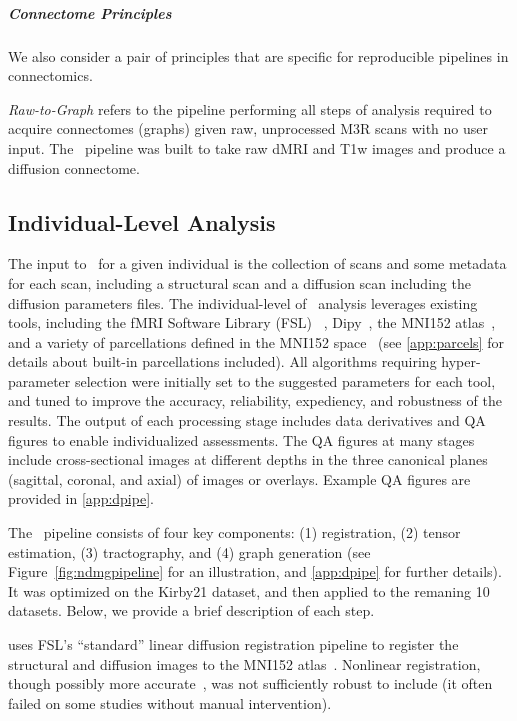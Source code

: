 \documentclass[11pt]{article}
\begin{document}
\begin{multicols}{2}
\subparagraph*{Connectome Principles} We also consider a pair of principles that are specific for reproducible pipelines in connectomics.

\emph{Raw-to-Graph} refers to the pipeline performing all steps of analysis required to acquire connectomes (graphs) given raw, unprocessed M3R scans with no user input.
The \ndmg~pipeline was built to take raw dMRI and T1w images and produce a diffusion connectome.


\subsection{Individual-Level Analysis}



%

The input to \ndmg~for a given individual is the collection of scans and some metadata for each scan, including a structural scan and a diffusion scan including the diffusion parameters files.
The individual-level of \ndmg~analysis leverages existing tools, including the fMRI Software Library (FSL) ~\cite{fsl1, fsl2, fsl3}, Dipy~\cite{dipy}, the MNI152 atlas~\cite{mni152}, and a variety of parcellations defined in the MNI152 space~\cite{desikan, aal, jhu, harvardoxford, talairach, slab907, slab1068, pvt, glasser} (see \ref{app:parcels} for details about built-in parcellations included).
All algorithms requiring hyper-parameter selection were initially set to the suggested parameters for each tool, and tuned to improve the accuracy, reliability, expediency, and robustness of the results.
The output of each processing stage includes data derivatives and QA figures to enable individualized assessments.
The QA figures at many stages include cross-sectional images at different depths in the three canonical planes (sagittal, coronal, and axial) of images or overlays.
Example QA figures are provided in \ref{app:dpipe}.

The \ndmg~pipeline consists of four key components: (1) registration, (2) tensor estimation, (3) tractography, and (4) graph generation (see Figure~\ref{fig:ndmgpipeline} for an illustration, and 
\ref{app:dpipe} for further details).
It was optimized on the Kirby21 dataset, and then applied to the remaning 10 datasets.
Below, we provide a brief description of each step.

\begin{description}[style=unboxed,leftmargin=0cm]
    \item[Registration] uses FSL's ``standard'' linear diffusion registration pipeline to register the structural and diffusion images to the MNI152 atlas~\cite{fsl1,fsl2,fsl3,mni152}.
    Nonlinear registration, though possibly more accurate~\cite{klein,lddmm}, was not sufficiently robust to include (it often failed on some studies without manual intervention).
    

\end{description}
\end{multicols}
\end{document}
